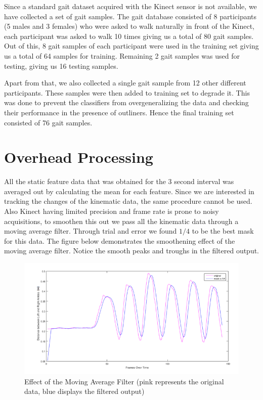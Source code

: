 \noindent Since a standard gait dataset acquired with the Kinect sensor is not available, we have collected a set of gait samples. The gait database consisted of 8 participants (5 males and 3 females) who were asked to walk naturally in front of the Kinect, each participant was asked to walk 10 times giving us a total of 80 gait samples. Out of this, 8 gait samples of each participant were used in the training set giving us a total of 64 samples for training. Remaining 2 gait samples was used for testing, giving us 16 testing samples.

\noindent Apart from that, we also collected a single gait sample from 12 other different participants. These samples were then added to training set to degrade it. This was done to prevent the classifiers from overgeneralizing the data and checking their performance in the presence of outliners. Hence the final training set consisted of 76 gait samples.

\newpage
\section{Overhead Processing} \label{Overhead Processing} 
\noindent All the static feature data that was obtained for the 3 second interval was averaged out by calculating the mean for each feature.                                                                                                                                                                                                               Since we are interested in tracking the changes of the kinematic data, the same procedure cannot be used. Also Kinect having limited precision and frame rate is prone to noisy acquisitions, to smoothen this out we pass all the kinematic data through a moving average filter. Through trial and error we found $1/4$ to be the best mask for this data.
The figure below demonstrates the smoothening effect of the moving average filter. Notice the smooth peaks and troughs in the filtered output.

\begin{figure}[h]
\centering
\includegraphics[scale=0.7]{filter.png}
\caption{Effect of the Moving Average Filter (pink represents the original data, blue displays the filtered output)}
\end{figure}
\newpage
